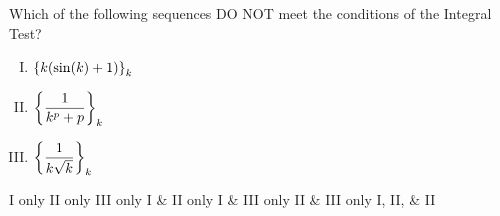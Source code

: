 \begin{questions}
\question Which of the following sequences DO NOT meet the conditions of the Integral Test?
\begin{multicols}{3}
\begin{enumerate}[I.]
  \item $\displaystyle \left\{k(\sin(k)+1)\right\}_{k}$
  \item $\displaystyle \left\{ \frac{1}{k^p+p} \right\}_{k}$
  \item $\displaystyle \left\{ \frac{1}{k\sqrt{k}} \right\}_{k}$
\end{enumerate}
\end{multicols}

\begin{choices}
  \choice I only
  \choice II only
  \choice III only
  \choice I \& II only
  \choice I \& III only
  \choice II \& III only
  \choice I, II, \& II
\end{choices}\vfill





\end{questions}